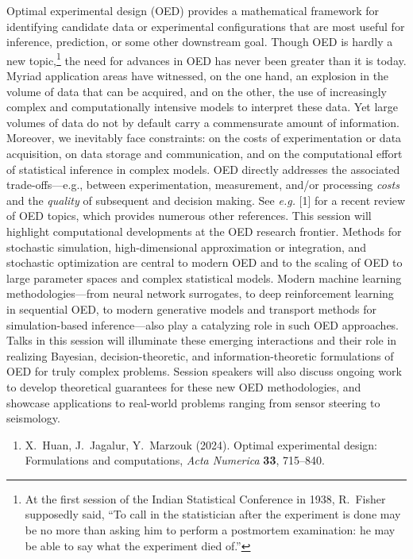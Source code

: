 \begin{session}
 Optimal experimental design (OED) provides a mathematical framework for identifying candidate data or experimental configurations that are most useful for inference, prediction, or some other downstream goal. Though OED is hardly a new topic,\footnote{At the first session of the Indian Statistical Conference in 1938, R.\ Fisher supposedly said, ``To call in the statistician after the experiment is done may be no more than asking him to perform a postmortem examination: he may be able to say what the experiment died of.''} the need for advances in OED has never been greater than it is today. Myriad application areas have witnessed, on the one hand, an explosion in the volume of data that can be acquired, and on the other, the use of increasingly complex and computationally intensive models to interpret these data. Yet large volumes of data do not by default carry a commensurate amount of information. Moreover, we inevitably face constraints: on the costs of experimentation or data acquisition, on data storage and communication, and on the computational effort of statistical inference in complex models. OED directly addresses the associated trade-offs---e.g., between experimentation, measurement, and/or processing \textit{costs} and
 the \textit{quality} of subsequent and decision making. See {\it e.g.} [1] for a recent review of OED topics, which provides numerous other references.
 This session will highlight computational developments at the OED research frontier. Methods for stochastic simulation, high-dimensional approximation or integration, and stochastic optimization are central to modern OED and to the scaling of OED to large parameter spaces and complex statistical models. Modern machine learning methodologies---from neural network surrogates, to deep reinforcement learning in sequential OED, to modern generative models and transport methods for simulation-based inference---also play a catalyzing role in such OED approaches. Talks in this session will illuminate these emerging interactions and their role in realizing Bayesian, decision-theoretic, and information-theoretic formulations of OED for truly complex problems. Session speakers will also discuss ongoing work to develop theoretical guarantees for these new OED methodologies, and showcase applications to real-world problems ranging from sensor steering to seismology.
 \medskip
 \begin{enumerate}
 \item[{[1]}] X.\ Huan, J.\ Jagalur, Y.\ Marzouk (2024). Optimal experimental design: Formulations and computations, \textit{Acta Numerica} \textbf{33}, 715--840.
 \end{enumerate}
\end{session}

